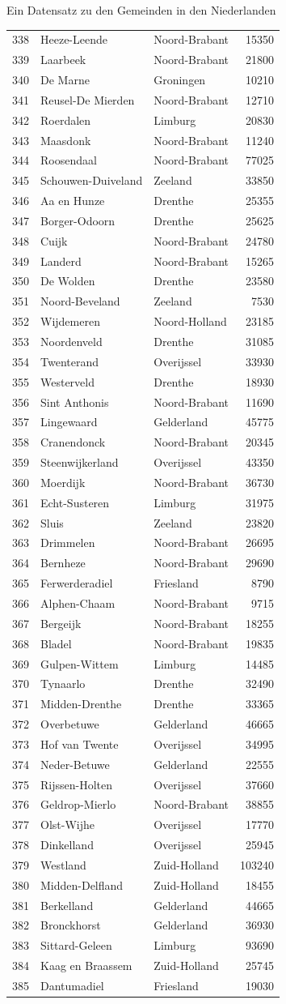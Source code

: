 \documentclass[ignorenonframetext,]{beamer}
\begin{document}
\begin{frame}[fragile]{Ein Datensatz zu den Gemeinden in den
Niederlanden}
\begin{longtable}[]{@{}lllr@{}}
338 & Heeze-Leende & Noord-Brabant & 15350\tabularnewline
339 & Laarbeek & Noord-Brabant & 21800\tabularnewline
340 & De Marne & Groningen & 10210\tabularnewline
341 & Reusel-De Mierden & Noord-Brabant & 12710\tabularnewline
342 & Roerdalen & Limburg & 20830\tabularnewline
343 & Maasdonk & Noord-Brabant & 11240\tabularnewline
344 & Roosendaal & Noord-Brabant & 77025\tabularnewline
345 & Schouwen-Duiveland & Zeeland & 33850\tabularnewline
346 & Aa en Hunze & Drenthe & 25355\tabularnewline
347 & Borger-Odoorn & Drenthe & 25625\tabularnewline
348 & Cuijk & Noord-Brabant & 24780\tabularnewline
349 & Landerd & Noord-Brabant & 15265\tabularnewline
350 & De Wolden & Drenthe & 23580\tabularnewline
351 & Noord-Beveland & Zeeland & 7530\tabularnewline
352 & Wijdemeren & Noord-Holland & 23185\tabularnewline
353 & Noordenveld & Drenthe & 31085\tabularnewline
354 & Twenterand & Overijssel & 33930\tabularnewline
355 & Westerveld & Drenthe & 18930\tabularnewline
356 & Sint Anthonis & Noord-Brabant & 11690\tabularnewline
357 & Lingewaard & Gelderland & 45775\tabularnewline
358 & Cranendonck & Noord-Brabant & 20345\tabularnewline
359 & Steenwijkerland & Overijssel & 43350\tabularnewline
360 & Moerdijk & Noord-Brabant & 36730\tabularnewline
361 & Echt-Susteren & Limburg & 31975\tabularnewline
362 & Sluis & Zeeland & 23820\tabularnewline
363 & Drimmelen & Noord-Brabant & 26695\tabularnewline
364 & Bernheze & Noord-Brabant & 29690\tabularnewline
365 & Ferwerderadiel & Friesland & 8790\tabularnewline
366 & Alphen-Chaam & Noord-Brabant & 9715\tabularnewline
367 & Bergeijk & Noord-Brabant & 18255\tabularnewline
368 & Bladel & Noord-Brabant & 19835\tabularnewline
369 & Gulpen-Wittem & Limburg & 14485\tabularnewline
370 & Tynaarlo & Drenthe & 32490\tabularnewline
371 & Midden-Drenthe & Drenthe & 33365\tabularnewline
372 & Overbetuwe & Gelderland & 46665\tabularnewline
373 & Hof van Twente & Overijssel & 34995\tabularnewline
374 & Neder-Betuwe & Gelderland & 22555\tabularnewline
375 & Rijssen-Holten & Overijssel & 37660\tabularnewline
376 & Geldrop-Mierlo & Noord-Brabant & 38855\tabularnewline
377 & Olst-Wijhe & Overijssel & 17770\tabularnewline
378 & Dinkelland & Overijssel & 25945\tabularnewline
379 & Westland & Zuid-Holland & 103240\tabularnewline
380 & Midden-Delfland & Zuid-Holland & 18455\tabularnewline
381 & Berkelland & Gelderland & 44665\tabularnewline
382 & Bronckhorst & Gelderland & 36930\tabularnewline
383 & Sittard-Geleen & Limburg & 93690\tabularnewline
384 & Kaag en Braassem & Zuid-Holland & 25745\tabularnewline
385 & Dantumadiel & Friesland & 19030\tabularnewline

\end{longtable}
\end{frame}
\end{document}
